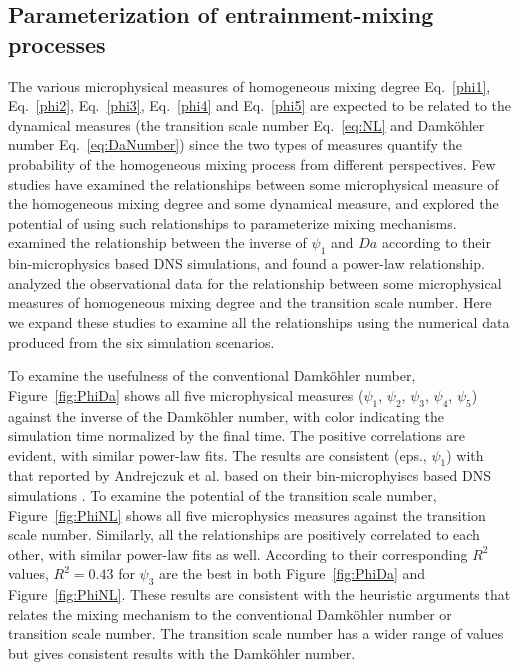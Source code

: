 \documentclass[draft,jgrga]{AGUTeX}
\newcommand{\Eq}[1]{Eq.~\eqref{#1}} \newcommand{\Fig}[1]{Figure~\ref{#1}}
\begin{document}
\begin{article}
\subsection{Parameterization of entrainment-mixing processes}
The various microphysical measures of homogeneous mixing degree \Eq{phi1}, \Eq{phi2}, \Eq{phi3}, \Eq{phi4} and \Eq{phi5} are expected to be related to the dynamical measures (the transition scale number \Eq{eq:NL} and Damk\"ohler number \Eq{eq:DaNumber}) since the two types of measures quantify the probability of the homogeneous mixing process from different perspectives. Few studies have examined the relationships between some microphysical measure of the homogeneous mixing degree and some dynamical measure, and explored the potential of using such relationships to parameterize mixing mechanisms. \citep{And09} examined the relationship between the inverse of $\psi_1$ and $Da$ according to their bin-microphysics based DNS simulations, and found a power-law relationship. \cite{Lu2013} analyzed the observational data for the relationship between some microphysical measures of homogeneous mixing degree and the transition scale number. Here we expand these studies to examine all the relationships using the numerical data produced from the six simulation scenarios.

To examine the usefulness of the conventional Damk\"{o}hler number, 
\Fig{fig:PhiDa} shows all five microphysical measures ($\psi_1$, $\psi_2$, $\psi_3$, $\psi_4$, $\psi_5$) against the inverse of the Damk\"{o}hler number, with color indicating the simulation time normalized by the final time. The positive correlations are evident, with similar power-law fits. The results are consistent (eps., $\psi_1$) with that reported by Andrejczuk et al. based on their bin-microphyiscs based DNS simulations \cite{And09}. To examine the potential of the transition scale number, \Fig{fig:PhiNL} shows all five microphysics measures against the transition scale number. Similarly, all the relationships are positively correlated to each other, with similar power-law fits as well. According to their corresponding $R^2$ values, $R^2 = 0.43$ for $\psi_3$ are the best in both \Fig{fig:PhiDa} and \Fig{fig:PhiNL}. These results are consistent with the heuristic arguments that relates the mixing mechanism to the conventional Damk\"{o}hler number or transition scale number. The transition scale number has a wider range of values but gives consistent results with the Damk\"ohler number.


\end{article}
\end{document}
